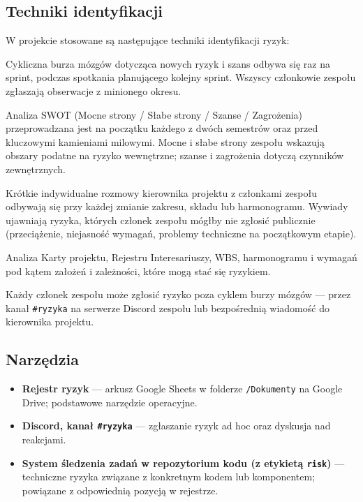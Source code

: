\documentclass[11pt,a4paper]{article}
\begin{document}
	\subsection{Techniki identyfikacji}
	W projekcie stosowane są następujące techniki identyfikacji ryzyk:
	\begin{description}[style=nextline]
		\item[Burza mózgów]
		Cykliczna burza mózgów dotycząca nowych ryzyk i szans odbywa się raz na sprint, podczas spotkania planującego kolejny sprint. Wszyscy członkowie zespołu zgłaszają obserwacje z minionego okresu.
		
		\item[SWOT]
		Analiza SWOT (Mocne strony / Słabe strony / Szanse / Zagrożenia) przeprowadzana jest na początku każdego z dwóch semestrów oraz przed kluczowymi kamieniami milowymi. Mocne i słabe strony zespołu wskazują obszary podatne na ryzyko wewnętrzne; szanse i zagrożenia dotyczą czynników zewnętrznych.
		
		\item[Wywiady]
		Krótkie indywidualne rozmowy kierownika projektu z członkami zespołu odbywają się przy każdej zmianie zakresu, składu lub harmonogramu. Wywiady ujawniają ryzyka, których członek zespołu mógłby nie zgłosić publicznie (przeciążenie, niejasność wymagań, problemy techniczne na początkowym etapie).
		
		\item[Przegląd dokumentacji]
		Analiza Karty projektu, Rejestru Interesariuszy, WBS, harmonogramu i wymagań pod kątem założeń i zależności, które mogą stać się ryzykiem.
		
		\item[Zgłoszenia ad hoc]
		Każdy członek zespołu może zgłosić ryzyko poza cyklem burzy mózgów --- przez kanał \texttt{\#ryzyka} na serwerze Discord zespołu lub bezpośrednią wiadomość do kierownika projektu.
	\end{description}
	
	\subsection{Narzędzia}
	\begin{itemize}[noitemsep]
		\item \textbf{Rejestr ryzyk} --- arkusz Google Sheets w folderze \texttt{/Dokumenty} na Google Drive; podstawowe narzędzie operacyjne.
		\item \textbf{Discord, kanał \texttt{\#ryzyka}} --- zgłaszanie ryzyk ad hoc oraz dyskusja nad reakcjami.
		\item \textbf{System śledzenia zadań w repozytorium kodu (z etykietą \texttt{risk})} --- techniczne ryzyka związane z konkretnym kodem lub komponentem; powiązane z odpowiednią pozycją w rejestrze.
	\end{itemize}
	
\end{document}
